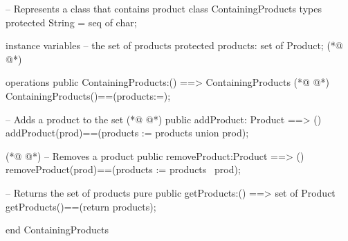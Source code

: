 \begin{vdmpp}[breaklines=true]
-- Represents a class that contains product
class ContainingProducts
 types 
   protected String = seq of char;

 instance variables
  -- the set of products
   protected products: set of Product;
(*@
\label{ContainingProducts:9}
@*)
   
 operations
  public ContainingProducts:() ==> ContainingProducts 
(*@
\label{addProduct:12}
@*)
  ContainingProducts()==(products:={});
 
  -- Adds a product to the set
(*@
\label{removeProduct:15}
@*)
  public addProduct: Product ==> ()
  addProduct(prod)==(products := products union {prod});
  
(*@
\label{getProducts:18}
@*)
  -- Removes a product
  public removeProduct:Product ==> () 
  removeProduct(prod)==(products := products \ {prod});
  
  -- Returns the set of products
  pure public getProducts:() ==> set of Product 
  getProducts()==(return products);

end ContainingProducts
\end{vdmpp}
